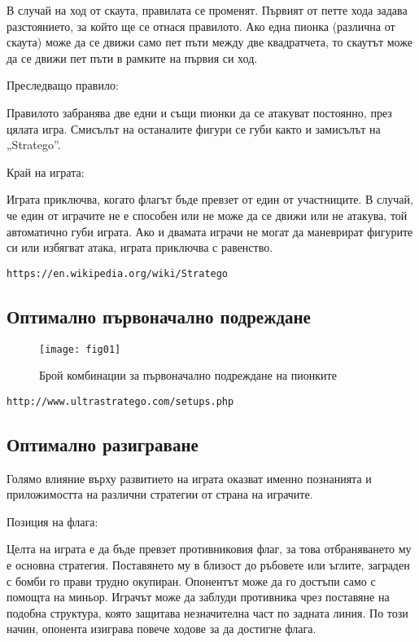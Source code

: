 В случай на ход от скаута, правилата се променят. Първият от петте хода задава разстоянието, за който ще се отнася правилото. Ако една пионка (различна от скаута) може да се движи само пет пъти между две квадратчета, то скаутът може да се движи пет пъти в рамките на първия си ход.

Преследващо правило:

Правилото забранява две едни и същи пионки да се атакуват постоянно, през цялата игра. Смисълът на останалите фигури се губи както и замисълът на „Stratego”.

Край на играта:

Играта приключва, когато флагът бъде превзет от един от участниците. В случай, че един от играчите не е способен или не може да се движи или не атакува, той автоматично губи играта. Ако и двамата играчи не могат да маневрират фигурите си или избягват атака, играта приключва с равенство. 

\begin{lstlisting}
https://en.wikipedia.org/wiki/Stratego
\end{lstlisting}

\subsection{Оптимално първоначално подреждане}

\begin{figure}[h!]
 \centering
 \texttt{[image: fig01]}
 \caption{Брой комбинации за първоначално подреждане на пионките \cite{arts01}}
\label{figure01}
\end{figure}
\FloatBarrier

\begin{lstlisting}
http://www.ultrastratego.com/setups.php
\end{lstlisting}

\subsection{Оптимално разиграване}

Голямо влияние върху развитието на играта оказват именно познанията и приложимостта  на различни стратегии от страна на играчите.

Позиция на флага:

Целта на играта е да бъде превзет противниковия флаг, за това отбраняването му е основна стратегия. Поставянето му в близост до ръбовете или ъглите, заграден с бомби го прави трудно  окупиран. Опонентът може да го достъпи само с помощта на миньор. Играчът може да  заблуди противника чрез поставяне на подобна структура, която защитава незначителна част по задната линия. По този начин, опонента изиграва повече ходове за да достигне флага.


